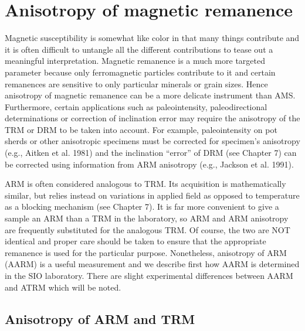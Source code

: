  \section{Anisotropy of magnetic remanence}
 
 Magnetic susceptibility is somewhat like color in that many things contribute and it is often difficult to  untangle all the different contributions to tease out a meaningful interpretation.   Magnetic remanence is a much more targeted parameter because only ferromagnetic particles contribute to it and certain remanences are sensitive to only particular minerals or grain sizes.  Hence anisotropy of magnetic remanence can be a more delicate instrument than AMS.  Furthermore, certain applications such as paleointensity,  paleodirectional determinations or correction of inclination error may require the anisotropy of the TRM or DRM to be taken into account.  For example, paleointensity on pot sherds or other anisotropic specimens must be corrected for  specimen's anisotropy (e.g., 
 Aitken et al. 1981) \nocite{aitken81}  and the inclination ``error'' of DRM (see Chapter 7) can be corrected using information from ARM anisotropy (e.g., 
 Jackson et al. 1991).  \nocite{jackson91}
 
  ARM is often considered analogous to TRM.  Its acquisition is mathematically similar, but relies instead on variations in applied field as opposed to temperature as a blocking mechanism (see Chapter 7).   It is far more convenient to give a sample an ARM than a TRM in the laboratory, so ARM and ARM anisotropy are frequently substituted for the analogous TRM.  Of course, the two are NOT identical and proper care should be taken to ensure that the appropriate remanence is used for the particular purpose.  Nonetheless, anisotropy of ARM (AARM) is a useful measurement and we describe first how AARM is determined in the SIO laboratory.  There are slight experimental differences between AARM and ATRM which will be noted.  


 \subsection{Anisotropy of ARM and TRM}
 \label{sect:aarm}
  
